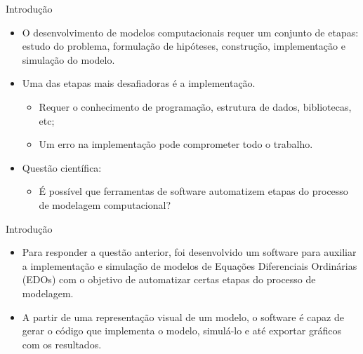 \begin{frame}{Introdução}
    \begin{itemize}
        \item O desenvolvimento de modelos computacionais requer um conjunto de etapas: estudo do problema, formulação de hipóteses, construção, implementação e simulação do modelo. 
        \item Uma das etapas mais desafiadoras é a implementação.
        \begin{itemize}
            \item Requer o conhecimento de programação, estrutura de dados, bibliotecas, etc; 
            \item Um erro na implementação pode comprometer todo o trabalho. 
        \end{itemize}
        \item Questão científica: 
        \begin{itemize}
            \item É possível que ferramentas de software automatizem etapas do processo de modelagem computacional?
        \end{itemize}
    \end{itemize}
\end{frame}

\begin{frame}{Introdução}
    \begin{itemize}
        \item Para responder a questão anterior, foi desenvolvido um software para auxiliar a implementação e simulação de modelos de Equações Diferenciais Ordinárias (EDOs) com o objetivo de automatizar certas etapas do processo de modelagem. 
        \item A partir de uma representação visual de um modelo, o software é capaz de gerar o código que implementa o modelo, simulá-lo e até exportar gráficos com os resultados.
    \end{itemize}
\end{frame}
